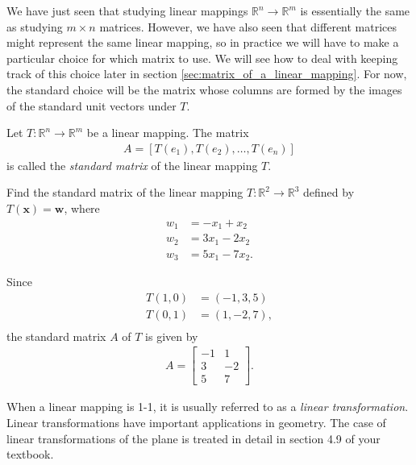 \documentclass[12pt,letterpaper,reqno]{article}
\numberwithin{equation}{section}
\begin{document}
We have just seen that studying linear mappings $\mathbb{R}^n \to \mathbb{R}^m$ is essentially the same as studying $m \times n$ matrices. However, we have also seen that different matrices might represent the same linear mapping, so in practice we will have to make a particular choice for which matrix to use. We will see how to deal with keeping track of this choice later in section \ref{sec:matrix_of_a_linear_mapping}. For now, the standard choice will be the matrix whose columns are formed by the images of the standard unit vectors under $T$.

\begin{defn}
	Let $T:\mathbb{R}^n \to \mathbb{R}^m$ be a linear mapping. The matrix 
	\begin{align*}
		A=\left[T(e_1),T(e_2),\dots,T(e_n)\right]
	\end{align*}
	is called the \emph{standard matrix} of the linear mapping $T$.
\end{defn}

\begin{exercise}
Find the standard matrix of the linear mapping $T:\mathbb{R}^2 \to \mathbb{R}^3$ defined by $T(\mathbf{x})=\mathbf{w}$, where
\begin{align*}
	w_1&=-x_1+x_2 \\
	w_2&=3x_1-2x_2 \\
	w_3&=5x_1-7x_2.
\end{align*}	
\end{exercise}

{\color{red}
\begin{solution}
	Since
	\begin{align*}
		T(1,0)&=(-1,3,5) \\
		T(0,1)&=(1,-2,7), \\
	\end{align*}
	the standard matrix $A$ of $T$ is given by
	\begin{align*}
		A=\begin{bmatrix}
			-1 & 1 \\
			3 & -2 \\
			5 & 7
		\end{bmatrix}.
	\end{align*}
\end{solution}}

When a linear mapping is 1-1, it is usually referred to as a \emph{linear transformation}. Linear transformations have important applications in geometry. The case of linear transformations of the plane is treated in detail in section 4.9 of your textbook.
\end{document}

